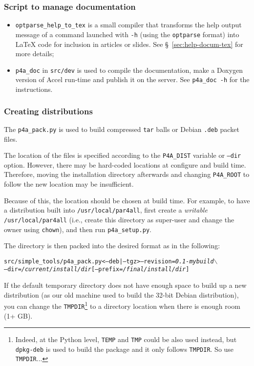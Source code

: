 \documentclass[a4paper]{article}
\begin{document}
\subsubsection{Script to manage documentation}
\label{sec:script-deal-with}

\begin{itemize}
\item \verb|optparse_help_to_tex| is a small compiler that transforms the
  help output message of a command launched with \texttt{-h} (using
  the \texttt{optparse} format) into La\TeX{} code for inclusion
  in articles or slides. See \S~\ref{sec:help-docum-tex} for more details;
\item \verb|p4a_doc| in \verb|src/dev| is used to compile the \Apfa
  documentation, make a Doxygen version of \Apfa Accel run-time and
  publish it on the server. See \texttt{p4a\_doc -h} for the instructions.
\end{itemize}


\subsubsection{Creating distributions}
\label{sec:making-distributions}

The \verb|p4a_pack.py| is used to build compressed \texttt{tar} balls or Debian
\texttt{.deb} packet files.

The location of the \Apfa files is specified according
to the \verb|P4A_DIST| variable or \texttt{--dir} option. However, there may be
hard-coded locations at configure and build time. Therefore, moving the
installation directory afterwards and changing \verb|P4A_ROOT| to follow
the new location may be insufficient.

Because of this, the location should be chosen at build time. For
example, to have a distribution built
into \texttt{/usr/local/par4all},
first create a \emph{writable} \texttt{/usr/local/par4all} (i.e.,
create this directory as super-user and change the owner using
\texttt{chown}), and then run \verb|p4a_setup.py|.

The directory is then packed into the desired format as in the
following:
\begin{alltt}
src/simple_tools/p4a_pack.py <--deb|--tgz> --revision=\emph{0.1-mybuild} \(\backslash\)
  --dir=\emph{/current/install/dir} [--prefix=\emph{/final/install/dir}]
\end{alltt}

If the default temporary directory does not have enough space to build up a new
distribution (as our old machine used to build the 32-bit Debian
distribution), you can change the \texttt{TMPDIR}\footnote{Indeed, at the
  Python level, \texttt{TEMP} and \texttt{TMP} could be also used instead,
  but \texttt{dpkg-deb} is used to build the package and it only follows
  \texttt{TMPDIR}. So use \texttt{TMPDIR}...} to a directory location when
there is enough room (1+ GB).
\end{document}
